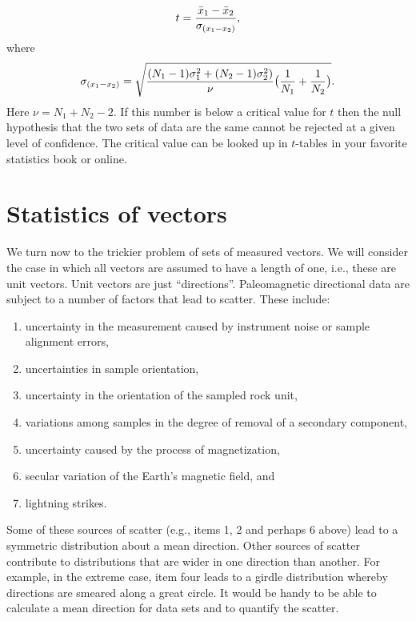 $$
{t} = { {\bar x_1 - \bar x_2} \over {\sigma_{(x_1-x_2)} }},
$$
\noindent where
$$
 {\sigma_{(x_1-x_2)} } = \sqrt{ 
{ {(N_1-1)\sigma_1^2 + (N_2 -1)\sigma_2^2)}\over {\nu} }
{\bigl({ {1\over{N_1} }+ { {1\over{N_2} }\bigr) }}}
}.
$$
\noindent  Here $\nu= N_1+N_2 -2$.     If this number is below a critical value for $t$ then the null hypothesis that the two sets of data are the same cannot be rejected at a given level of confidence.  The critical value can be looked up in $t$-tables in your favorite statistics book or online.   


\section{Statistics of vectors}

We turn now to the trickier problem of sets of measured vectors. We will consider the case in which all 
vectors are assumed to have a length of one, i.e., these are  unit vectors.  Unit vectors are just ``directions''.    Paleomagnetic
directional data are subject to a number of factors that lead to scatter.  These
include: 

\begin{enumerate}
\item uncertainty in the measurement caused by  instrument noise or
sample alignment errors,
\item uncertainties in sample orientation,
\item uncertainty in the orientation of the sampled rock unit,
\item variations among samples in the degree of removal of a secondary
component,
\item uncertainty caused by  the process of magnetization, 
\item secular variation of the Earth's magnetic field, and
\item lightning strikes.
\end{enumerate}

Some of these sources of scatter (e.g., items  1, 2 and perhaps 6 above) lead to a symmetric distribution about a mean direction.    Other sources  of scatter contribute to
distributions that are wider in one direction than another. For example, in the extreme case, item four
leads to a girdle distribution whereby directions are smeared along a great circle.
 It would be handy to be able to calculate a
mean direction for data sets and to quantify the scatter.  



